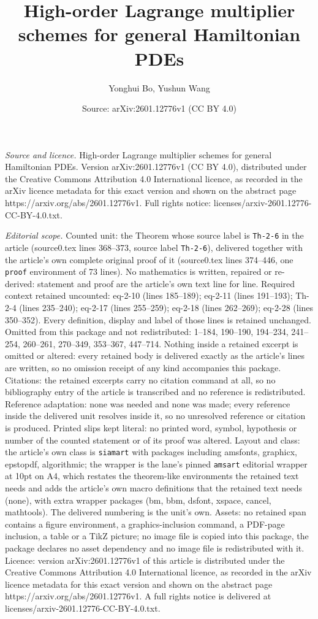 \documentclass[10pt,a4paper]{amsart}
\title[High-order Lagrange multiplier schemes for general Hamiltoni]{High-order Lagrange multiplier schemes for general Hamiltonian PDEs}
\author{Yonghui Bo, Yushun Wang}
\date{Source: arXiv:2601.12776v1 (CC BY 4.0)}
\begin{document}
\maketitle

\noindent\emph{Source and licence.} High-order Lagrange multiplier schemes for general Hamiltonian PDEs. Version arXiv:2601.12776v1 (CC BY 4.0), distributed under the Creative Commons Attribution 4.0 International licence, as recorded in the arXiv licence metadata for this exact version and shown on the abstract page https://arxiv.org/abs/2601.12776v1. Full rights notice: licenses/arxiv-2601.12776-CC-BY-4.0.txt.\par\smallskip

\noindent\textit{Editorial scope.} Counted unit: the Theorem whose source label is \texttt{Th-2-6} in the article (source0.tex lines 368--373, source label \texttt{Th-2-6}), delivered together with the article's own complete original proof of it (source0.tex lines 374--446, one \texttt{proof} environment of 73 lines). No mathematics is written, repaired or re-derived: statement and proof are the article's own text line for line. Required context retained uncounted: eq-2-10 (lines 185--189); eq-2-11 (lines 191--193); Th-2-4 (lines 235--240); eq-2-17 (lines 255--259); eq-2-18 (lines 262--269); eq-2-28 (lines 350--352). Every definition, display and label of those lines is retained unchanged. Omitted from this package and not redistributed: 1--184, 190--190, 194--234, 241--254, 260--261, 270--349, 353--367, 447--714. Nothing inside a retained excerpt is omitted or altered: every retained body is delivered exactly as the article's lines are written, so no omission receipt of any kind accompanies this package. Citations: the retained excerpts carry no citation command at all, so no bibliography entry of the article is transcribed and no reference is redistributed. Reference adaptation: none was needed and none was made; every reference inside the delivered unit resolves inside it, so no unresolved reference or citation is produced. Printed slips kept literal: no printed word, symbol, hypothesis or number of the counted statement or of its proof was altered. Layout and class: the article's own class is \texttt{siamart} with packages including amsfonts, graphicx, epstopdf, algorithmic; the wrapper is the lane's pinned \texttt{amsart} editorial wrapper at 10pt on A4, which restates the theorem-like environments the retained text needs and adds the article's own macro definitions that the retained text needs (none), with extra wrapper packages (bm, bbm, dsfont, xspace, cancel, mathtools). The delivered numbering is the unit's own. Assets: no retained span contains a figure environment, a graphics-inclusion command, a PDF-page inclusion, a table or a TikZ picture; no image file is copied into this package, the package declares no asset dependency and no image file is redistributed with it. Licence: version arXiv:2601.12776v1 of this article is distributed under the Creative Commons Attribution 4.0 International licence, as recorded in the arXiv licence metadata for this exact version and shown on the abstract page https://arxiv.org/abs/2601.12776v1. A full rights notice is delivered at licenses/arxiv-2601.12776-CC-BY-4.0.txt. 
\end{document}
